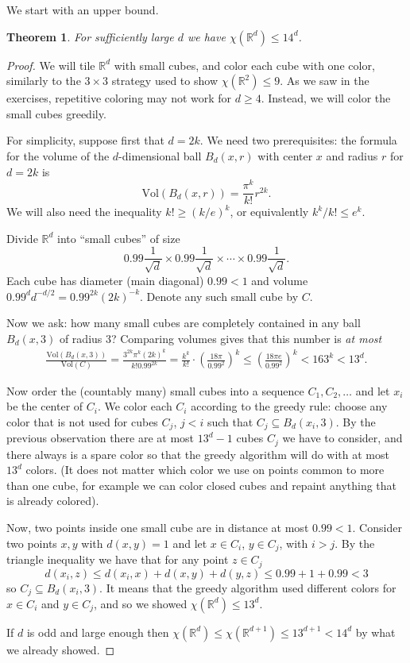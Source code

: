 \documentclass[a4paper]{article}
\theoremstyle{plain}
\newtheorem{theorem}[lemma]{Theorem}
\theoremstyle{myremark}
\newcommand{\RR}{\mathbb{R}}
\newcommand{\vol}{\mathrm{Vol}}
\begin{document}
We start with an upper bound.

\begin{theorem}
For sufficiently large $d$ we have $\chi(\RR^d)\leq 14^d$.
\end{theorem}
\begin{proof}
We will tile $\RR^d$ with small cubes, and color each cube with one color, similarly to the $3\times 3$ strategy used to show $\chi(\RR^2)\leq 9$. As we saw in the exercises, repetitive coloring may not work for $d\geq 4$. Instead, we will color the small cubes greedily.

For simplicity, suppose first that $d=2k$. We need two prerequisites: the formula for the volume of the $d$-dimensional ball $B_d(x,r)$ with center $x$ and radius $r$ for $d=2k$ is
$$\vol(B_d(x,r)) = \frac{\pi^k}{k!}r^{2k}.$$
We will also need the inequality $k!\geq(k/e)^k$, or equivalently $k^k/k!\leq e^k$.

Divide $\RR^d$ into ``small cubes'' of size
$$0.99\frac{1}{\sqrt{d}}\times 0.99\frac{1}{\sqrt{d}}\times\cdots\times 0.99\frac{1}{\sqrt{d}}.$$
Each cube has diameter (main diagonal) $0.99<1$ and volume $0.99^dd^{-d/2}=0.99^{2k}(2k)^{-k}$. Denote any such small cube by $C$.

Now we ask: how many small cubes are completely contained in any  ball $B_d(x,3)$ of radius $3$? Comparing volumes gives that this number is \emph{at most}
\begin{align*}
\frac{\vol(B_d(x,3))}{\vol(C)} = \frac{3^{2k}\pi^k(2k)^k}{k!0.99^{2k}}=\frac{k^k}{k!}\cdot(\frac{18\pi}{0.99^2})^k\leq (\frac{18\pi e}{0.99^2})^k<163^k<13^d.
\end{align*}

Now order the (countably many) small cubes into a sequence $C_1,C_2,\ldots$ and let $x_i$ be the center of $C_i$. We color each $C_i$ according to the greedy rule: choose any color that is not used for cubes $C_j$, $j<i$ such that $C_j\subseteq B_d(x_i,3)$. By the previous observation there are at most $13^d-1$ cubes $C_j$ we have to consider, and there always is a spare color so that the greedy algorithm will do with at most $13^d$ colors. (It does not matter which color we use on points common to more than one cube, for example we can color closed cubes and repaint anything that is already colored).

Now, two points inside one small cube are in distance at most $0.99<1$. Consider two points $x,y$ with $d(x,y)=1$ and let $x\in C_i$, $y\in C_j$, with $i>j$. By the triangle inequality we have that for any point $z\in C_j$ 
$$d(x_i,z)\leq d(x_i,x)+d(x,y)+d(y,z)\leq 0.99+1+0.99<3$$
so $C_j\subseteq B_d(x_i,3)$. It means that the greedy algorithm used different colors for $x\in C_i$ and $y\in C_j$, and so we showed $\chi(\RR^d)\leq 13^d$.

If $d$ is odd and large enough then $\chi(\RR^d)\leq \chi(\RR^{d+1})\leq 13^{d+1}<14^d$ by what we already showed.
\end{proof}
\end{document}
